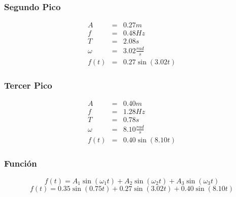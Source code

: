 \documentclass[12pt]{exam}
\begin{document}
\begin{multicols}{2}
  \subsubsection{Segundo Pico}
   \begin{eqnarray*}
    A & = & 0.27 m\\
    f & = & 0.48 Hz\\
    T & = & 2.08 s\\
    \omega & = & 3.02 \frac{rad}{s}\\
    f(t) & = & 0.27\sin(3.02t)
  \end{eqnarray*}
  \subsubsection{Tercer Pico}
   \begin{eqnarray*}
    A & = & 0.40 m\\
    f & = & 1.28 Hz\\
    T & = & 0.78 s\\
    \omega & = & 8.10 \frac{rad}{s}\\
    f(t) & = & 0.40\sin(8.10t)
  \end{eqnarray*}
  \subsubsection{Función}
  $$f(t) = A_1\sin(\omega_1t) + A_2\sin(\omega_2t) + A_3\sin(\omega_3t)$$
  $$f(t) = 0.35\sin(0.75t) + 0.27\sin(3.02t) + 0.40\sin(8.10t)$$
\end{multicols}
\end{document}
